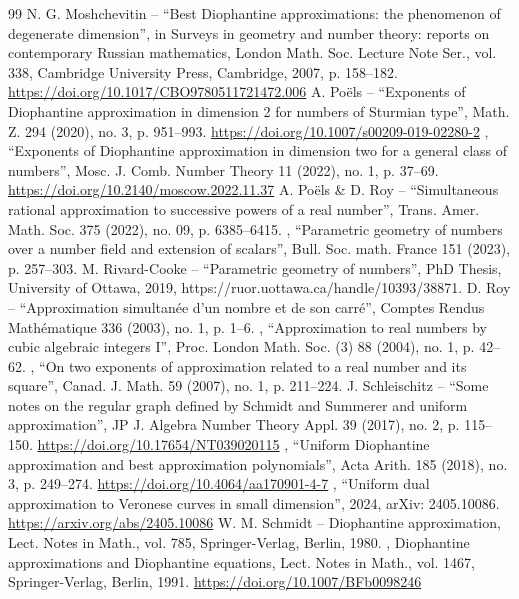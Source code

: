 \begin{thebibliography}{99}
 N. G. Moshchevitin – “Best Diophantine approximations: the phenomenon of degenerate dimension”, in Surveys in geometry and number theory: reports on contemporary Russian mathematics, London Math. Soc. Lecture Note Ser., vol. 338, Cambridge University Press, Cambridge, 2007, p. 158–182. \url{https://doi.org/10.1017/CBO9780511721472.006}
 A. Poëls – “Exponents of Diophantine approximation in dimension 2 for numbers of Sturmian type”, Math. Z. 294 (2020), no. 3, p. 951–993. \url{https://doi.org/10.1007/s00209-019-02280-2}
 \textemdash{}, “Exponents of Diophantine approximation in dimension two for a general class of numbers”, Mosc. J. Comb. Number Theory 11 (2022), no. 1, p. 37–69. \url{https://doi.org/10.2140/moscow.2022.11.37}
 A. Poëls \& D. Roy – “Simultaneous rational approximation to successive powers of a real number”, Trans. Amer. Math. Soc. 375 (2022), no. 09, p. 6385–6415. 
 \textemdash{}, “Parametric geometry of numbers over a number field and extension of scalars”, Bull. Soc. math. France 151 (2023), p. 257–303. 
 M. Rivard-Cooke – “Parametric geometry of numbers”, PhD Thesis, University of Ottawa, 2019, https://ruor.uottawa.ca/handle/10393/38871. 
 D. Roy – “Approximation simultanée d’un nombre et de son carré”, Comptes Rendus Mathématique 336 (2003), no. 1, p. 1–6. 
 \textemdash{}, “Approximation to real numbers by cubic algebraic integers I”, Proc. London Math. Soc. (3) 88 (2004), no. 1, p. 42–62. 
 \textemdash{}, “On two exponents of approximation related to a real number and its square”, Canad. J. Math. 59 (2007), no. 1, p. 211–224. 
 J. Schleischitz – “Some notes on the regular graph defined by Schmidt and Summerer and uniform approximation”, JP J. Algebra Number Theory Appl. 39 (2017), no. 2, p. 115–150. \url{https://doi.org/10.17654/NT039020115}
 \textemdash{}, “Uniform Diophantine approximation and best approximation polynomials”, Acta Arith. 185 (2018), no. 3, p. 249–274. \url{https://doi.org/10.4064/aa170901-4-7}
 \textemdash{}, “Uniform dual approximation to Veronese curves in small dimension”, 2024, arXiv: 2405.10086. \url{https://arxiv.org/abs/2405.10086}
 W. M. Schmidt – Diophantine approximation, Lect. Notes in Math., vol. 785, Springer-Verlag, Berlin, 1980. 
 \textemdash{}, Diophantine approximations and Diophantine equations, Lect. Notes in Math., vol. 1467, Springer-Verlag, Berlin, 1991. \url{https://doi.org/10.1007/BFb0098246}
\end{thebibliography}
